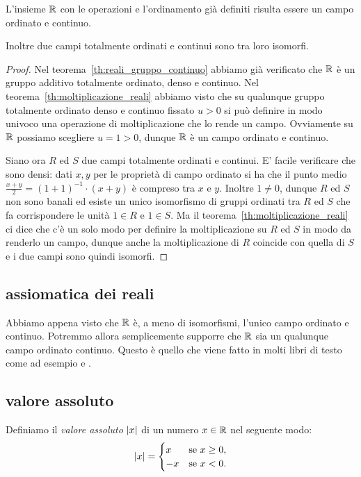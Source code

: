 \begin{theorem}
  \label{th:reali_campo}%
L'insieme ${\mathbb R}$ con le operazioni e l'ordinamento già definiti 
risulta essere un campo ordinato e continuo.

Inoltre due campi totalmente ordinati e continui sono tra loro isomorfi.
\end{theorem}
\begin{proof}
Nel teorema~\ref{th:reali_gruppo_continuo} abbiamo già verificato che ${\mathbb R}$ 
è un gruppo additivo totalmente ordinato, denso e continuo.
Nel teorema~\ref{th:moltiplicazione_reali} abbiamo visto 
che su qualunque gruppo totalmente ordinato denso e continuo 
fissato $u>0$
si può definire in modo univoco una operazione di moltiplicazione 
che lo rende un campo. Ovviamente su ${\mathbb R}$ possiamo scegliere $u=1>0$,
dunque ${\mathbb R}$ è un campo ordinato e continuo.

Siano ora $R$ ed $S$ due campi totalmente ordinati e continui. 
E' facile verificare che sono densi: dati $x,y$ 
per le proprietà di campo ordinato si ha che il punto medio 
$\frac{x+y}{2}=(1+1)^{-1}\cdot (x+y)$ è compreso tra $x$ e $y$.
Inoltre $1\neq 0$, dunque $R$ ed $S$ non sono banali ed esiste 
un unico isomorfismo di gruppi ordinati tra $R$ ed $S$ che fa 
corrispondere le unità $1\in R$ e $1\in S$.
Ma il teorema~\ref{th:moltiplicazione_reali} ci dice che c'è un solo 
modo per definire la moltiplicazione su $R$ ed $S$ in modo da renderlo un campo,
dunque anche la moltiplicazione di $R$ coincide con quella di $S$
e i due campi sono quindi isomorfi.
\end{proof}

\subsection{assiomatica dei reali}

Abbiamo appena visto che ${\mathbb R}$ è, a meno di isomorfismi, l'unico campo 
ordinato e continuo.
Potremmo allora semplicemente supporre che ${\mathbb R}$ sia un qualunque 
campo ordinato continuo. 
Questo è quello che viene fatto in molti libri di testo come ad esempio
\cite{Giusti} e \cite{Marcellini}.



\subsection{valore assoluto}

\begin{definition}
\mymark{***}
Definiamo il \emph{valore assoluto}%
%
 ${\left|x\right|}$ di un numero $x\in {\mathbb R}$ nel seguente modo:
\[
{\left|x\right|} =
\begin{cases}
  x & \text{se $x\ge 0$}, \\
  -x & \text{se $x<0 $}.
\end{cases}
\]
\end{definition}
  
